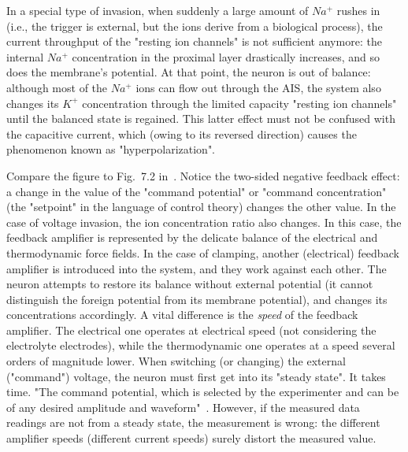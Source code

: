 In a special type of invasion, when suddenly a large amount of $Na^+$ rushes in (i.e., the trigger is external, but the ions derive from a biological process),
the current throughput of the "resting ion channels" 
is not sufficient anymore: the internal $Na^+$ concentration in the proximal layer drastically increases, and so does the 
membrane's potential. At that point, the neuron is out of balance: although most of the $Na^+$ ions can
flow out through the \gls{AIS}, the system also changes its $K^+$ concentration through the limited capacity "resting ion channels" until the balanced state is regained. This latter effect must not be confused with the capacitive current, which (owing to its reversed direction) causes the phenomenon known as "hyperpolarization".
\else

\fi


\ifx\magyar\undefined

Compare the figure to Fig.~7.2 in~\cite{PrinciplesNeuralScience:2013}.
Notice the two-sided negative feedback effect: a change in the value of the 
"command potential" or "command concentration" (the "setpoint" in the language of control theory) changes the other value.
In the case of voltage invasion, the ion concentration ratio also changes. In this case, the feedback amplifier is represented by the 
delicate balance of the electrical and thermodynamic force fields.
In the case of clamping, another (electrical) feedback amplifier is introduced
into the system, and they work against each other. The neuron attempts 
to restore its balance without external potential (it cannot distinguish the foreign potential from its membrane potential), and changes its concentrations accordingly.
A vital difference is the \textit{speed} of the feedback amplifier. The electrical one operates at electrical speed (not considering the electrolyte electrodes), while the thermodynamic one operates at a speed several orders of magnitude lower.
When switching (or changing) the external ("command") voltage,
the neuron must first get into its "steady state". It takes time.
"The command potential, which is selected
by the experimenter and can be of any desired amplitude
and waveform"~\cite{PrinciplesNeuralScience:2013}. However, if the measured data readings are not from a steady state,
the measurement is wrong: the different amplifier speeds (different current speeds) surely distort the measured value. 



